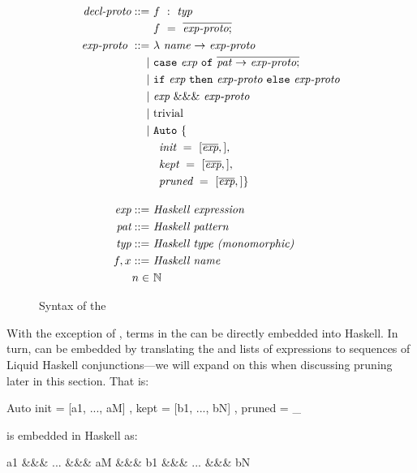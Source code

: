\begin{figure}
\begin{align*}
  \textit{decl-proto} ::= &
  ~ f ~ : ~ \textit{typ} \\ &
  ~ f ~ = ~ \overline{\textit{exp-proto} ;}
  \\
  \textit{exp-proto}~ ::= &
    ~ \mathtt{\lambda} ~ \textit{name} ~ \mathtt{\rightarrow} ~ \textit{exp-proto} \\ \mid &
    ~ \mathtt{case} ~ \textit{exp} ~ \mathtt{of} ~ \overline{\textit{pat} ~ \mathtt{\rightarrow} ~ \textit{exp-proto} ;} \\ \mid &
    ~ \mathtt{if} ~ \textit{exp} ~ \mathtt{then} ~ \textit{exp-proto} ~ \mathtt{else} ~ \textit{exp-proto} \\ \mid &
    ~ \textit{exp} ~ \&\&\& ~ \textit{exp-proto} \\ \mid &
    ~ \text{trivial} \\ \mid &
    ~ \mathtt{Auto} ~ \{ \\ &
    ~ \hspace{0.5em} \textit{init}~=~[\overline{\textit{exp}},], \\ &
    ~ \hspace{0.5em} \textit{kept}~=~[\overline{\textit{exp}},], \\ &
    ~ \hspace{0.5em} \textit{pruned}~=~[\overline{\textit{exp}},] \} 
  \\[1em]
  \textit{exp} ::= & ~ \textit{Haskell expression} 
  \\
  \textit{pat} ::= & ~ \textit{Haskell pattern} 
  \\
  \textit{typ} ::= & ~ \textit{Haskell type (monomorphic)} 
  \\
  f, x ::= & ~ \textit{Haskell name} 
  \\
  n \in & ~ \mathbb{N}
\end{align*}
\caption{Syntax of the \LangB}
\label{fig:langb-syntax}
\end{figure}

With the exception of , terms in the \LangB can be directly
embedded into Haskell. In turn,  can be embedded by
translating the  and  lists of expressions to
sequences of Liquid Haskell conjunctions---we will expand on this when
discussing pruning later in this section. That is:
\begin{code}
  Auto { init = [a1, ..., aM]
       , kept = [b1, ..., bN]
       , pruned = _ }
\end{code}
is embedded in Haskell as:
\begin{code}
  a1 &&& ... &&& aM &&& b1 &&& ... &&& bN
\end{code}


